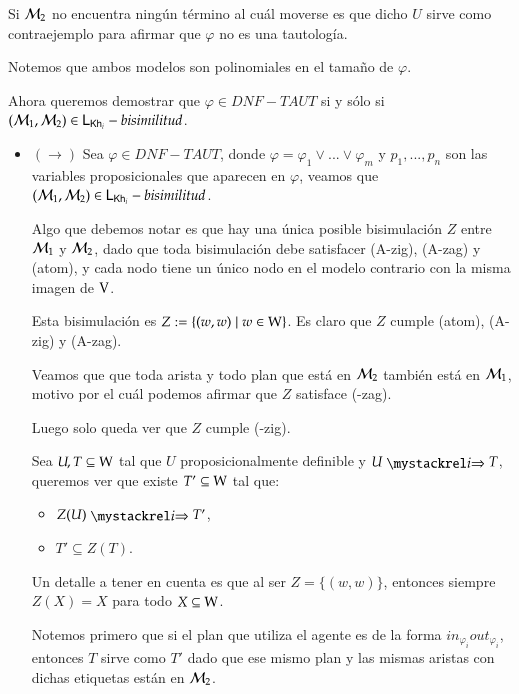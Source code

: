 \begin{demostracion}
    Si $\mathcal{M}_2$ no encuentra ningún término al cuál moverse es que dicho $U$ sirve como contraejemplo para afirmar que $\varphi$ no es una tautología.

\medskip\medskip
        
    Notemos que ambos modelos son polinomiales en el tamaño de $\varphi$.

    Ahora queremos demostrar que $\varphi \in DNF-TAUT$ si y sólo si $(\mathcal{M}_1,\mathcal{M}_2) \in \mathsf{L}_{\mathsf{Kh}_i}-bisimilitud$.
    \begin{itemize}

    \item $(\rightarrow)$ Sea $\varphi \in DNF-TAUT$, donde $\varphi = \varphi_1 \vee ... \vee \varphi_m$ y $p_1,...,p_n$ son las variables proposicionales que aparecen en $\varphi$, veamos que $(\mathcal{M}_1,\mathcal{M}_2) \in \mathsf{L}_{\mathsf{Kh}_i}-bisimilitud$.

    Algo que debemos notar es que hay una única posible bisimulación $Z$ entre $\mathcal{M}_1$ y $\mathcal{M}_2$, dado que toda bisimulación debe satisfacer (A-zig), (A-zag) y (atom), y cada nodo tiene un único nodo en el modelo contrario con la misma imagen de $\mathrm{V}$.

    Esta bisimulación es $Z := \{(w,w) \mid w \in \mathrm{W} \}$. Es claro que $Z$ cumple (atom), (A-zig) y (A-zag).

    Veamos que que toda arista y todo plan que está en $\mathcal{M}_2$ también está en $\mathcal{M}_1$, motivo por el cuál podemos afirmar que $Z$ satisface (\KHilogic-zag). 

    Luego solo queda ver que $Z$ cumple (\KHilogic-zig).

    Sea $U, T \subseteq \mathrm{W}$ tal que $U$ proposicionalmente definible y $U \ultsExecAgi T$, queremos ver que existe $T' \subseteq \mathrm{W}$ tal que:

    \begin{multicols}{2}
        \begin{itemize}
            \item $Z(U) \ultsExecAgi T'$, 
            \item $T' \subseteq Z(T)$.
        \end{itemize}
    \end{multicols}

    Un detalle a tener en cuenta es que al ser $Z = \{(w,w)\}$, entonces siempre $Z(X) = X$ para todo $X \subseteq \mathrm{W}$.

    Notemos primero que si el plan que utiliza el agente es de la forma $in_{\varphi_i}out_{\varphi_i}$, entonces $T$ sirve como $T'$ dado que ese mismo plan y las mismas aristas con dichas etiquetas están en $\mathcal{M}_2$.


\end{itemize}
\end{demostracion}
